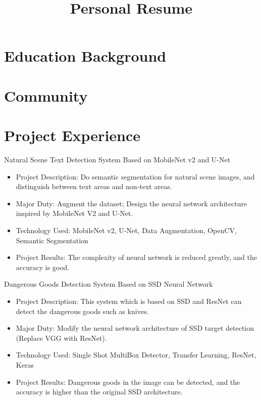 \documentclass[11pt, a4paper]{moderncv}
\title{Personal Resume}
\begin{document}
	\maketitle
	
	\section{Education Background}

	\section{Community}
	
	\section{Project Experience}
	{Natural Scene Text Detection System Based on MobileNet v2 and U-Net}
	{}{}{}{
		\begin{itemize}
			\item Project Description: Do semantic segmentation for natural scene images, and distinguish between text areas and non-text areas.
			\item Major Duty: Augment the dataset; Design the neural network architecture inspired by MobileNet V2 and U-Net.
			\item Technology Used: MobileNet v2, U-Net, Data Augmentation, OpenCV, Semantic Segmentation
			\item Project Results: The complexity of neural network is reduced greatly, and the accuracy is good.
		\end{itemize}}{}	  

	{Dangerous Goods Detection System Based on SSD Neural Network}
	{}{}{}{
		\begin{itemize}
			\item Project Description: This system which is based on SSD and ResNet can detect the dangerous goods such as knives.
			\item Major Duty: Modify the neural network architecture of SSD target detection (Replace VGG with ResNet).
			\item Technology Used: Single Shot MultiBox Detector, Transfer Learning, ResNet, Keras
			\item Project Results: Dangerous goods in the image can be detected, and the accuracy is higher than the original SSD architecture.
	\end{itemize}}{}
\end{document}
